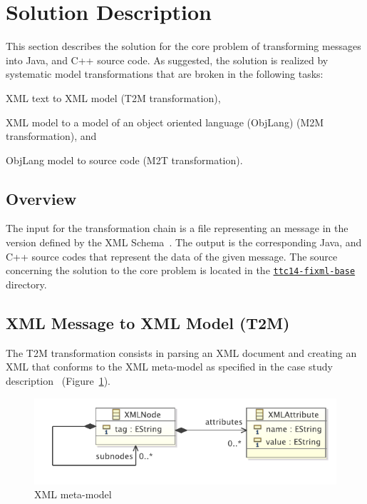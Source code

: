 
\section{Solution Description}
\label{sec:SolutionDescription}

This section describes the solution for the core problem of transforming \FIXML messages into Java, \Csharp and C++ source code.
As suggested, the solution is realized by systematic model transformations that are broken in the following tasks:
\begin{inparaenum}[(1)]
  \item XML text to XML model (T2M transformation),
  \item XML model to a model of an object oriented language (ObjLang) (M2M transformation), and
  \item ObjLang model to source code (M2T transformation).
\end{inparaenum}

\subsection{Overview}

The input for the transformation chain is a file representing an \FIXML message in the  version defined by the \FIXML XML Schema~\cite{FIXML2004}.
The output is the corresponding Java, \Csharp and C++ source codes that represent the data of the given \FIXML message. 
The source concerning the solution to the core problem is located in the \href{https://github.com/fikovnik/ttc14-fixml-sigma/tree/master/ttc14-fixml-base}{\texttt{ttc14-fixml-base}} directory.

\subsection{\FIXML XML Message to XML Model (T2M)}

The T2M transformation consists in parsing an \FIXML XML document and creating an XML that conforms to the XML meta-model as specified in the case study description~\cite{Lano2014} (\Cf Figure~\ref{fig:XMLMetaModel}).

\begin{figure}[h!bt]
  \centering
  \includegraphics[width=.6\textwidth]{figures/XMLMetaModel.pdf}
  \caption{XML meta-model}
  \label{fig:XMLMetaModel}
\end{figure}

